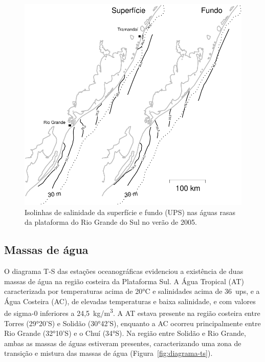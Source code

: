 \documentclass[a4paper,11pt,twoside,showtrims,onecolumn,openright,final]{memoir}
\begin{document}
\begin{figure}
\begin{center}
\includegraphics[height=0.6\textheight]{MAPA_SALINIDADE}
\end{center}
\caption[Isolinhas de salinidade da superfície e fundo]
	{Isolinhas de salinidade da superfície e fundo (UPS) nas águas rasas da
         plataforma do Rio Grande do Sul no verão de 2005.}
\label{fig:salinidade-sup-e-fundo}
\end{figure}



\subsection*{Massas de água}

% 

O diagrama T-S das estações oceanográficas evidenciou a existência de duas
massas de água na região costeira da Plataforma Sul. A Água Tropical (AT)
caracterizada por temperaturas acima de 20°C e salinidades acima de 36~ups, e
a Água Costeira (AC), de elevadas temperaturas e baixa salinidade,
e com valores de sigma-0 inferiores a 24,5~kg/m\textsuperscript{3}.
A AT estava presente na região costeira entre Torres (29°20'S) e Solidão (30°42'S), 
enquanto a AC ocorreu principalmente entre Rio Grande (32°10'S) e o Chuí (34°S).
Na região entre Solidão e Rio Grande, ambas as massas de águas estiveram
presentes, caracterizando uma zona de transição e mistura das massas
de água (Figura~\ref{fig:diagrama-ts}).
\end{document}

